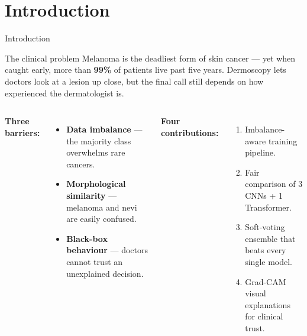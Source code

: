 \documentclass[10pt, aspectratio=169]{beamer}
\renewcommand{\framesubtitle}[1]{%
  \vspace*{-0.3em}\noindent{\large\bfseries\textcolor{usthdark}{#1}}\par\vspace{0.6em}%
}
\begin{document}
\section{Introduction}
\begin{frame}{Introduction}
    \framesubtitle{Problem \& Objectives}
    \begin{block}{The clinical problem}
        \small
        Melanoma is the deadliest form of skin cancer --- yet when caught early, more than \textbf{99\%} of patients live past five years. Dermoscopy lets doctors look at a lesion up close, but the final call still depends on how experienced the dermatologist is.
    \end{block}
    \vspace{0.15cm}
    \begin{columns}[T]
        \textbf{Three barriers:}
        \begin{itemize}\footnotesize
            \item \textbf{Data imbalance} --- the majority class overwhelms rare cancers.
            \item \textbf{Morphological similarity} --- melanoma and nevi are easily confused.
            \item \textbf{Black-box behaviour} --- doctors cannot trust an unexplained decision.
        \end{itemize}

        \textbf{Four contributions:}
        \begin{enumerate}\footnotesize
            \item Imbalance-aware training pipeline.
            \item Fair comparison of 3 CNNs + 1 Transformer.
            \item Soft-voting ensemble that beats every single model.
            \item Grad-CAM visual explanations for clinical trust.
        \end{enumerate}
    \end{columns}
\end{frame}

\end{document}
